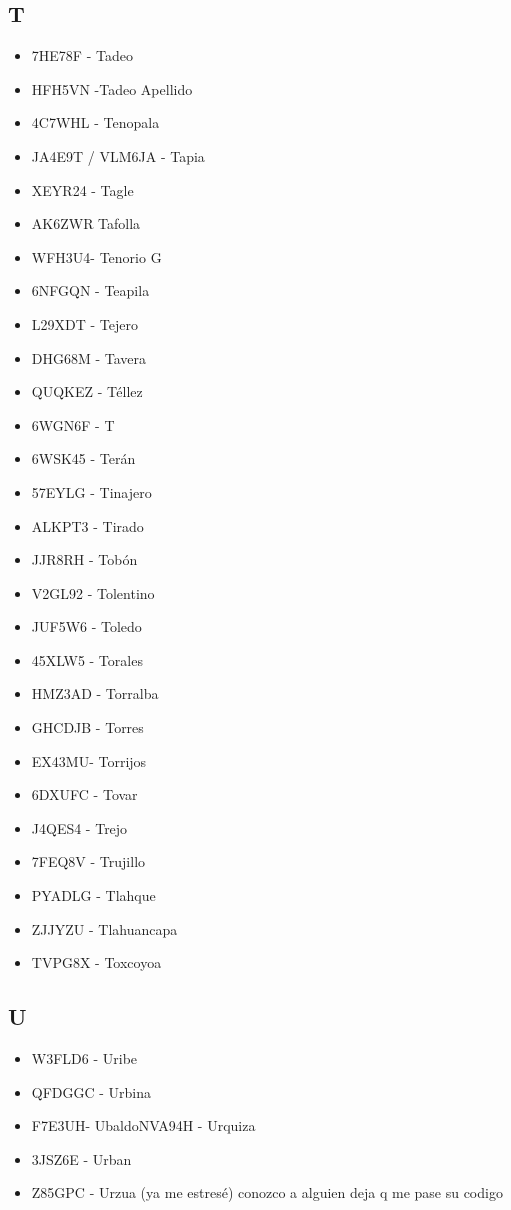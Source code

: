 \subsection*{T}
\begin{itemize}[leftmargin=*,nosep]
\item 7HE78F  -  Tadeo
\item HFH5VN -Tadeo Apellido
\item 4C7WHL - Tenopala
\item JA4E9T / VLM6JA  -  Tapia
\item XEYR24 - Tagle
\item AK6ZWR Tafolla
\item WFH3U4- Tenorio G
\item 6NFGQN - Teapila
\item L29XDT - Tejero
\item DHG68M - Tavera
\item QUQKEZ  -  Téllez
\item 6WGN6F - T
\item 6WSK45  -  Terán
\item 57EYLG - Tinajero
\item ALKPT3  -  Tirado
\item JJR8RH - Tobón
\item V2GL92 - Tolentino
\item JUF5W6 - Toledo
\item 45XLW5 - Torales
\item HMZ3AD  -  Torralba
\item GHCDJB  -  Torres
\item EX43MU- Torrijos
\item 6DXUFC  -  Tovar
\item J4QES4 - Trejo
\item 7FEQ8V - Trujillo
\item PYADLG -  Tlahque
\item ZJJYZU - Tlahuancapa
\item TVPG8X - Toxcoyoa
\end{itemize}

\subsection*{U}
\begin{itemize}[leftmargin=*,nosep]
\item W3FLD6  -  Uribe
\item QFDGGC - Urbina
\item F7E3UH- UbaldoNVA94H   -  Urquiza
\item 3JSZ6E - Urban
\item Z85GPC  -  Urzua (ya me estresé) conozco a alguien deja q me pase su codigo
\end{itemize}

